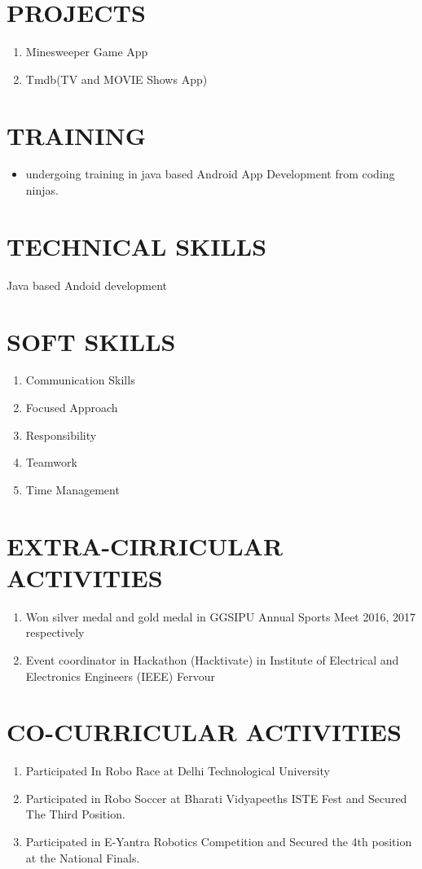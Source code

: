 \documentclass{article}
\begin{document}
\section{PROJECTS}
\Large
\begin{enumerate}
\item Minesweeper Game App
\item Tmdb(TV and MOVIE Shows App) 
\end{enumerate}

\section{TRAINING}
\begin{itemize}
\item undergoing training in java based Android App Development from coding ninjas.
\end{itemize}
\section{TECHNICAL SKILLS}
Java based Andoid development\\

\section{SOFT SKILLS}
\begin{enumerate}
\item Communication Skills\\
\item Focused Approach\\
\item Responsibility\\
\item Teamwork\\
\item  Time Management\\
\end{enumerate}

\section{EXTRA-CIRRICULAR ACTIVITIES}
\begin{enumerate}
\item Won silver medal and gold medal in GGSIPU Annual Sports Meet 2016, 2017 respectively
\item Event coordinator in Hackathon (Hacktivate) in Institute of  Electrical and Electronics Engineers (IEEE) Fervour 
\end{enumerate}

\section{CO-CURRICULAR ACTIVITIES}
\begin{enumerate}
\item Participated In Robo Race at Delhi Technological University
\item Participated in Robo Soccer at Bharati Vidyapeeths ISTE Fest and Secured The Third Position.
\item Participated in E-Yantra Robotics Competition and Secured the 4th position at the National Finals.
\end{enumerate}
\end{document}
